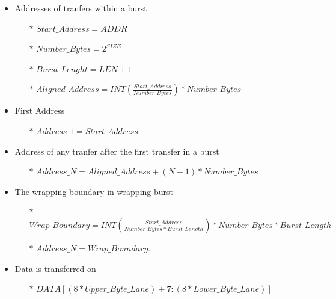 \documentclass{article}
\begin{document}
\begin{itemize}
    \item Addresses of tranfers within a burst
          \begin{itemize}
              \item[$*$] $Start\_Address = ADDR$
              \item[$*$] $Number\_Bytes = 2^{SIZE}$
              \item[$*$] $Burst\_Lenght = LEN + 1 $
              \item[$*$] $Aligned\_Address = INT(\frac{Start\_Address}{Number\_Bytes}) * Number\_Bytes$
          \end{itemize}
    \item First Address
          \begin{itemize}
              \item[$*$] $Address\_1 = Start\_Address$
          \end{itemize}
    \item Address of any tranfer after the first transfer in a burst
          \begin{itemize}
              \item[$*$] $Address\_N = Aligned\_Address + (N-1)*Number\_Bytes$
          \end{itemize}
    \item The wrapping boundary in wrapping burst
          \begin{itemize}
              \item[$*$] $Wrap\_Boundary = INT(\frac{Start\_Address}{Number\_Bytes * Burst\_Length}) * Number\_Bytes * Burst\_Length$
              \item[$*$] $Address\_N = Wrap\_Boundary$.
          \end{itemize}
    \item Data is transferred on
          \begin{itemize}
              \item[$*$] $DATA[(8*Upper\_Byte\_Lane) + 7 : (8*Lower\_Byte\_Lane)]$
          \end{itemize}
\end{itemize}
\end{document}
